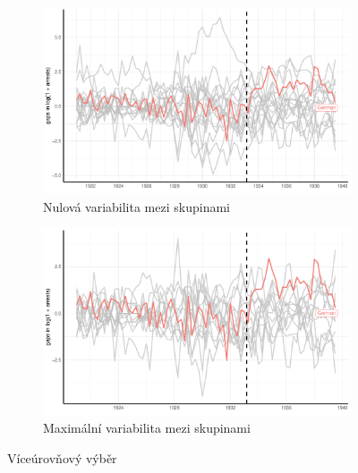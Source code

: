 \begin{figure}[hbtp] 
\begin{subfigure}{0.5\textwidth}
\includegraphics[width=0.9\linewidth]{plots/synthetic_control/until_pact/placebo_highlight_all.pdf}
\caption{Nulová variabilita mezi skupinami}
\label{fig:novar}
\end{subfigure}
\begin{subfigure}{0.5\textwidth}
\includegraphics[width=0.9\linewidth]{plots/synthetic_control/until_pact/placebo_highlight_mspe_5_lower.pdf}
\caption{Maximální variabilita mezi skupinami}
\label{fig:maxvar}
\end{subfigure}
\caption{Víceúrovňový výběr}
\label{fig_sc_placebo_gaps}
\end{figure}



